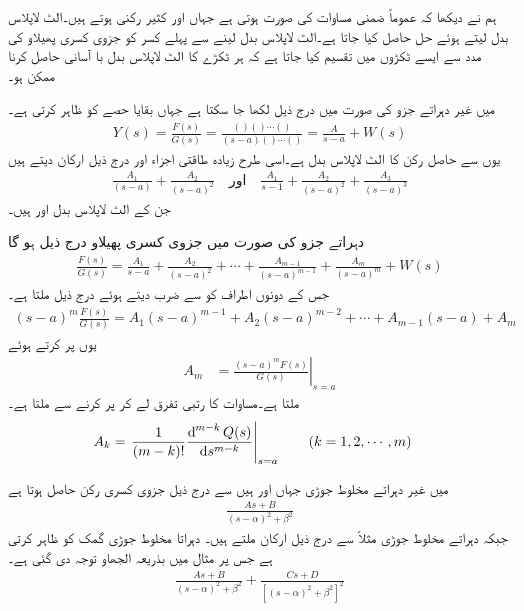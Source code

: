 ہم نے دیکھا کہ عموماً ضمنی مساوات کی صورت  ہوتی ہے جہاں  اور  کثیر رکنی ہوتے ہیں۔الٹ لاپلاس بدل لیتے ہوئے حل  حاصل کیا جاتا ہے۔الٹ لاپلاس بدل لینے سے پہلے کسر کو جزوی کسری پھیلاو کی مدد سے ایسے ٹکڑوں میں تقسیم کیا جاتا ہے کہ ہر ٹکڑے کا الٹ لاپلاس بدل با آسانی حاصل کرنا ممکن ہو۔

 میں غیر دہراتے جزو  کی صورت میں درج ذیل لکھا جا سکتا ہے جہاں  بقایا حصے کو ظاہر کرتی ہے۔
\begin{align}
Y(s)=\frac{F(s)}{G(s)}=\frac{()()\cdots()}{(s-a)()\cdots ()}=\frac{A}{s-a}+W(s)
\end{align}
یوں  سے حاصل رکن  کا الٹ لاپلاس بدل  ہے۔اسی طرح زیادہ طاقتی اجزاء  اور  درج ذیل ارکان دیتے ہیں
\begin{align}
\frac{A_1}{(s-a)}+\frac{A_2}{(s-a)^2} \quad \text{اور} \quad \frac{A_1}{s-1}+\frac{A_2}{(s-a)^2}+\frac{A_3}{(s-a)^3}
\end{align} 
جن کے الٹ لاپلاس بدل  اور  ہیں۔

دہراتے جزو  کی صورت میں جزوی کسری پھیلاو درج ذیل ہو گا
\begin{align}
\frac{F(s)}{G(s)}=\frac{A_1}{s-a}+\frac{A_2}{(s-a)^2}+\cdots+\frac{A_{m-1}}{(s-a)^{m-1}}+\frac{A_m}{(s-a)^m}+W(s)
\end{align}
جس کے دونوں اطراف کو  سے ضرب دیتے ہوئے درج ذیل ملتا ہے۔
\begin{align}\label{مساوات_لاپلاس_جزوی_کسری_عمومی_الف}
(s-a)^m\frac{F(s)}{G(s)}=A_1(s-a)^{m-1}+A_2(s-a)^{m-2}+\cdots+A_{m-1}(s-a)+A_m
\end{align}
یوں  پر کرتے ہوئے 
\begin{align}
A_m&=\left. \frac{(s-a)^m F(s)}{G(s)}\right|_{s=a}
\end{align}
ملتا ہے۔مساوات  کا  رتبی تفرق لے کر  پر کرنے سے  ملتا ہے۔
\begin{align}
A_k&=\left. \frac{1}{(m-k)!}\frac{\dif^{\, m-k} Q(s)}{\dif s^{m-k}}\right|_{s=a}\quad \quad (k=1,2,\cdots,m)
\end{align}

 میں غیر دہراتے مخلوط جوڑی  جہاں  اور  ہیں سے درج ذیل جزوی کسری رکن حاصل ہوتا ہے
\begin{align*}
\frac{As+B}{(s-\alpha)^2+\beta^2}
\end{align*}
جبکہ دہراتے مخلوط جوڑی مثلاً  سے درج ذیل ارکان ملتے ہیں۔ دہراتا مخلوط جوڑی گمک کو ظاہر کرتی ہے جس پر مثال  میں بذریعہ الجھاو  توجہ دی گئی ہے۔
\begin{align*}
\frac{As+B}{(s-\alpha)^2+\beta^2}+\frac{Cs+D}{[(s-\alpha)^2+\beta^2]^2}
\end{align*}

